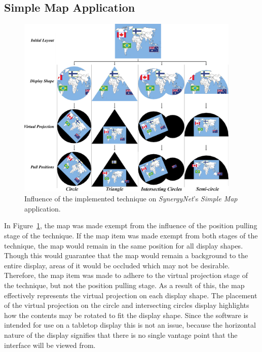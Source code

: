 \documentclass[twocolumn,compsoc]{cvm}
\begin{document}
{%

\subsection{Simple Map Application}
\label{subsec:simplemapresults} 

\begin{figure}[h!] 
 \centering
  \includegraphics[width=0.95\textwidth]{figures/MapApplication.jpeg}
  \caption{Influence of the implemented technique on {\emph{SynergyNet}}'s {\emph{Simple Map}} application.}
  \label{fig:mapApp}
\end{figure}

In Figure~\ref{fig:mapApp}, the map was made exempt from the influence of the position pulling stage of the technique.
If the map item was made exempt from both stages of the technique, the map would remain in the same position for all display shapes.
Though this would guarantee that the map would remain a background to the entire display, areas of it would be occluded which may not be desirable.
Therefore, the map item was made to adhere to the virtual projection stage of the technique, but not the position pulling stage.
As a result of this, the map effectively represents the virtual projection on each display shape.
The placement of the virtual projection on the circle and intersecting circles display highlights how the contents may be rotated to fit the display shape.
Since the software is intended for use on a tabletop display this is not an issue, because the horizontal nature of the display signifies that there is no single vantage point that the interface will be viewed from.

}
\end{document}
